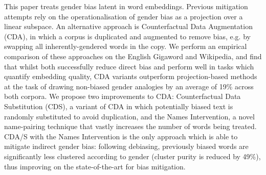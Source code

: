 This paper treats gender bias latent in word embeddings. Previous mitigation attempts rely on the operationalisation of gender bias as a projection over a linear subspace. An alternative approach is Counterfactual Data Augmentation (CDA), in which a corpus is duplicated and augmented to remove bias, e.g. by swapping all inherently-gendered words in the copy. We perform an empirical comparison of these approaches on the English Gigaword and Wikipedia, and find that whilst both successfully reduce direct bias and perform well in tasks which quantify embedding quality, CDA variants outperform projection-based methods at the task of drawing non-biased gender analogies by an average of 19\% across both corpora. We propose two improvements to CDA: Counterfactual Data Substitution (CDS), a variant of CDA in which potentially biased text is randomly substituted to avoid duplication, and the Names Intervention, a novel name-pairing technique that vastly increases the number of words being treated. CDA/S with the Names Intervention is the only approach which is able to mitigate indirect gender bias: following debiasing, previously biased words are significantly less clustered according to gender (cluster purity is reduced by 49\%), thus improving on the state-of-the-art for bias mitigation.